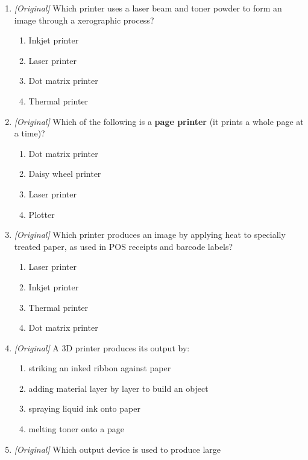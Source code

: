 \begin{enumerate}[label=\textbf{Q\arabic*.}, leftmargin=*]
\begin{enumerate}[label=\Alph*.]
    \item Inkjet printer
    \item Thermal printer
    \item Dot matrix printer
  \end{enumerate}
\item \textit{[Original]} Which printer uses a laser beam and toner powder to
  form an image through a xerographic process?
  \begin{enumerate}[label=\Alph*.]
    \item Inkjet printer
    \item Laser printer
    \item Dot matrix printer
    \item Thermal printer
  \end{enumerate}
\item \textit{[Original]} Which of the following is a \textbf{page printer}
  (it prints a whole page at a time)?
  \begin{enumerate}[label=\Alph*.]
    \item Dot matrix printer
    \item Daisy wheel printer
    \item Laser printer
    \item Plotter
  \end{enumerate}
\item \textit{[Original]} Which printer produces an image by applying heat to
  specially treated paper, as used in POS receipts and barcode labels?
  \begin{enumerate}[label=\Alph*.]
    \item Laser printer
    \item Inkjet printer
    \item Thermal printer
    \item Dot matrix printer
  \end{enumerate}
\item \textit{[Original]} A 3D printer produces its output by:
  \begin{enumerate}[label=\Alph*.]
    \item striking an inked ribbon against paper
    \item adding material layer by layer to build an object
    \item spraying liquid ink onto paper
    \item melting toner onto a page
  \end{enumerate}
\item \textit{[Original]} Which output device is used to produce large

\end{enumerate}
